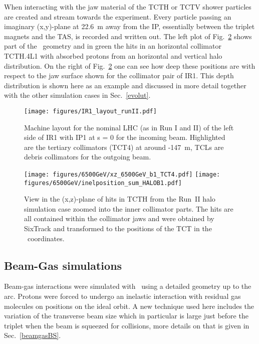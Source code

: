 When interacting with the jaw material of the TCTH or TCTV shower particles are created and stream towards the experiment. Every particle passing an imaginary (x,y)-plane at 22.6~m away from the IP, essentially between the triplet magnets and the TAS, is recorded and written out. The left plot of Fig.~\ref{tctHits} shows part of the \fluka~geometry and in green the hits in an horizontal collimator TCTH.4L1 with absorbed protons from an horizontal and vertical halo distribution. On the right of Fig.~\ref{tctHits} one can see how deep these positions are with respect to the jaw surface shown for the collimator pair of IR1. This depth distribution is shown here as an example and discussed in more detail together with the other simulation cases in Sec.~\ref{evolut}.

\begin{figure}%
\begin{center}
\texttt{[image: figures/IR1\_layout\_runII.pdf]}
\end{center}
\vspace{-0.6cm}
 \caption{Machine layout for the nominal LHC (as in Run I and II) of the left side of IR1 with IP1 at s = 0 for the incoming beam. Highlighted are the tertiary collimators (TCT4) at around -147~m, TCLs are debris collimators for the outgoing beam.
  \label{nominalLHC_layout}}
\end{figure}

\begin{figure}%
\begin{center}
  \texttt{[image: figures/6500GeV/xz\_6500GeV\_b1\_TCT4.pdf]}
  \texttt{[image: figures/6500GeV/inelposition\_sum\_HALOB1.pdf]}
\end{center}
\vspace{-0.6cm}
 \caption{View in the (x,z)-plane of hits in TCTH from the Run~II halo simulation case zoomed into the inner collimator parts. The hits are all contained within the collimator jaws and were obtained by SixTrack and transformed to the positions of the TCT in the \fluka~coordinates.
  \label{tctHits}}
\end{figure}


\subsection{Beam-Gas simulations}
Beam-gas interactions were simulated with \fluka~using a detailed geometry up to the arc. %
 Protons were forced to undergo an inelastic interaction with residual gas molecules on positions on the ideal orbit. A new technique used here includes the variation of the transverse beam size which in particular is large just before the triplet when the beam is squeezed for collisions, more details on that is given in Sec.~\ref{beamgasBS}. 

